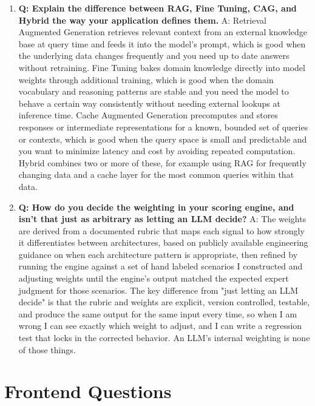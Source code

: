 \documentclass[11pt,a4paper]{report}
\begin{document}
\begin{enumerate}[leftmargin=*]
\item \textbf{Q: Explain the difference between RAG, Fine Tuning, CAG, and Hybrid the way your application defines them.}
A: Retrieval Augmented Generation retrieves relevant context from an external knowledge base at query time and feeds it into the model's prompt, which is good when the underlying data changes frequently and you need up to date answers without retraining. Fine Tuning bakes domain knowledge directly into model weights through additional training, which is good when the domain vocabulary and reasoning patterns are stable and you need the model to behave a certain way consistently without needing external lookups at inference time. Cache Augmented Generation precomputes and stores responses or intermediate representations for a known, bounded set of queries or contexts, which is good when the query space is small and predictable and you want to minimize latency and cost by avoiding repeated computation. Hybrid combines two or more of these, for example using RAG for frequently changing data and a cache layer for the most common queries within that data.

\item \textbf{Q: How do you decide the weighting in your scoring engine, and isn't that just as arbitrary as letting an LLM decide?}
A: The weights are derived from a documented rubric that maps each signal to how strongly it differentiates between architectures, based on publicly available engineering guidance on when each architecture pattern is appropriate, then refined by running the engine against a set of hand labeled scenarios I constructed and adjusting weights until the engine's output matched the expected expert judgment for those scenarios. The key difference from "just letting an LLM decide" is that the rubric and weights are explicit, version controlled, testable, and produce the same output for the same input every time, so when I am wrong I can see exactly which weight to adjust, and I can write a regression test that locks in the corrected behavior. An LLM's internal weighting is none of those things.
\end{enumerate}

\section{Frontend Questions}
\end{document}

